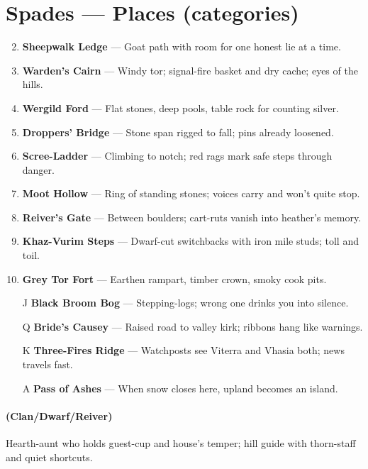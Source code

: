\section*{Spades --- Places (categories)}
\label{sec:ubral-places}
\begin{enumerate}
\setcounter{enumi}{1}
\item \textbf{Sheepwalk Ledge} --- Goat path with room for one honest lie at a time.
\item \textbf{Warden's Cairn} --- Windy tor; signal-fire basket and dry cache; eyes of the hills.
\item \textbf{Wergild Ford} --- Flat stones, deep pools, table rock for counting silver.
\item \textbf{Droppers' Bridge} --- Stone span rigged to fall; pins already loosened.
\item \textbf{Scree-Ladder} --- Climbing to notch; red rags mark safe steps through danger.
\item \textbf{Moot Hollow} --- Ring of standing stones; voices carry and won't quite stop.
\item \textbf{Reiver's Gate} --- Between boulders; cart-ruts vanish into heather's memory.
\item \textbf{Khaz-Vurim Steps} --- Dwarf-cut switchbacks with iron mile studs; toll and toil.
\item \textbf{Grey Tor Fort} --- Earthen rampart, timber crown, smoky cook pits.
\item[J] \textbf{Black Broom Bog} --- Stepping-logs; wrong one drinks you into silence.
\item[Q] \textbf{Bride's Causey} --- Raised road to valley kirk; ribbons hang like warnings.
\item[K] \textbf{Three-Fires Ridge} --- Watchposts see Viterra and Vhasia both; news travels fast.
\item[A] \textbf{Pass of Ashes} --- When snow closes here, upland becomes an island.
\end{enumerate}

\paragraph*{(Clan/Dwarf/Reiver)} Hearth-aunt who holds guest-cup and house's temper; hill guide with thorn-staff and quiet shortcuts.

